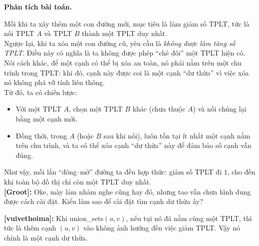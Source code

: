 \textbf{Phân tích bài toán.}

Mỗi khi ta xây thêm một con đường mới, mục tiêu là làm giảm số TPLT, tức là nối TPLT $A$ và TPLT $B$ thành một TPLT duy nhất. \\

Ngược lại, khi ta xóa một con đường cũ, yêu cầu là \textit{không được làm tăng số TPLT}. 
Điều này có nghĩa là ta không được phép ``chẻ đôi'' một TPLT hiện có. 
Nói cách khác, để một cạnh có thể bị xóa an toàn, nó phải nằm trên một chu trình trong TPLT: 
khi đó, cạnh này được coi là một cạnh ``dư thừa'' vì việc xóa nó không phá vỡ tính liên thông. \\

Từ đó, ta có chiến lược: 
\begin{itemize}
    \item Với một TPLT $A$, chọn một TPLT $B$ khác (chưa thuộc $A$) và nối chúng lại bằng một cạnh mới.
    \item Đồng thời, trong $A$ (hoặc $B$ sau khi nối), luôn tồn tại ít nhất một cạnh nằm trên chu trình, 
    và ta có thể xóa cạnh ``dư thừa'' này để đảm bảo số cạnh vẫn đúng.
\end{itemize}

Như vậy, mỗi lần ``đóng–mở'' đường ta đều hợp thức: giảm số TPLT đi $1$, 
cho đến khi toàn bộ đồ thị chỉ còn một TPLT duy nhất. \\

\textbf{[Groot]:} Oke, mày lảm nhảm nghe cũng hay đó, nhưng tao vẫn chưa hình dung được cách cài đặt. Kiểu làm sao để cài đặt tìm cạnh dư thừa ấy?

\textbf{[vuivethoima]:} Khi union\_sets$(u, v)$, nếu tụi nó đã nằm cùng một TPLT, thì tức là thêm cạnh $(u, v)$ vào không ảnh hưởng đến việc giảm TPLT. Vậy nó chính là một cạnh dư thừa.

